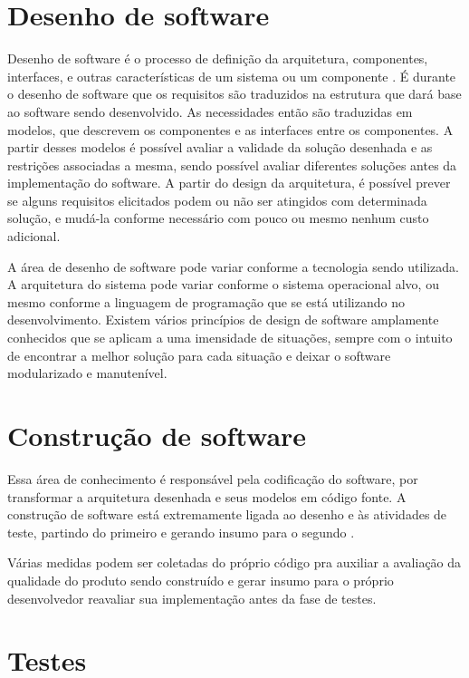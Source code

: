\section{Desenho de software}

Desenho de software é o processo de definição da arquitetura, componentes, interfaces, e outras características de um sistema ou um componente \cite{swebok}. É durante o desenho de software que os requisitos são traduzidos na estrutura que dará base ao software sendo desenvolvido. As necessidades então são traduzidas em modelos, que descrevem os componentes e as interfaces entre os componentes. A partir desses modelos é possível avaliar a validade da solução desenhada e as restrições associadas a mesma, sendo possível avaliar diferentes soluções antes da implementação do software. A partir do design da arquitetura, é possível prever se alguns requisitos elicitados podem ou não ser atingidos com determinada solução, e mudá-la conforme necessário com pouco ou mesmo nenhum custo adicional.

A área de desenho de software pode variar conforme a tecnologia sendo utilizada. A arquitetura do sistema pode variar conforme o sistema operacional alvo, ou mesmo conforme a linguagem de programação que se está utilizando no desenvolvimento. Existem vários princípios de design de software amplamente conhecidos que se aplicam a uma imensidade de situações, sempre com o intuito de encontrar a melhor solução para cada situação e deixar o software modularizado e manutenível.

\section{Construção de software}

Essa área de conhecimento é responsável pela codificação do software, por transformar a arquitetura desenhada e seus modelos em código fonte. A construção de software está extremamente ligada ao desenho e às atividades de teste, partindo do primeiro e gerando insumo para o segundo \cite{swebok}.

Várias medidas podem ser coletadas do próprio código pra auxiliar a avaliação da qualidade do produto sendo construído e gerar insumo para o próprio desenvolvedor reavaliar sua implementação antes da fase de testes.

\section{Testes}

